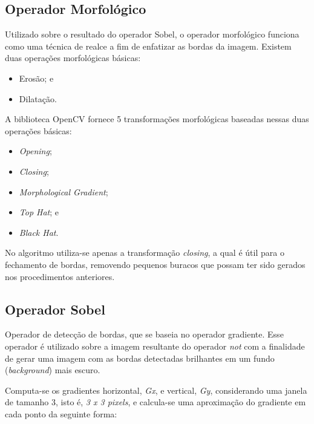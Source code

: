 \subsection{Operador Morfológico}
Utilizado sobre o resultado do operador Sobel, o operador morfológico funciona como uma técnica de realce a fim de enfatizar as bordas da imagem. 
Existem duas operações morfológicas básicas:
\begin{itemize}
    \item Erosão; e
    \item Dilatação.
\end{itemize}    

A biblioteca OpenCV fornece 5 transformações morfológicas baseadas nessas duas operações básicas:
\begin{itemize}
    \item \textit{Opening};
    \item \textit{Closing};
    \item \textit{Morphological Gradient};
    \item \textit{Top Hat}; e 
    \item \textit{Black Hat}.
\end{itemize} 

No algoritmo utiliza-se apenas a transformação \textit{closing}, a qual é útil para o fechamento de bordas, removendo pequenos buracos que possam ter sido gerados nos procedimentos anteriores.


\subsection{Operador Sobel}
Operador de detecção de bordas, que se baseia no operador gradiente. Esse operador é utilizado sobre a imagem resultante do operador \textit{not} com a finalidade de gerar uma imagem com as bordas detectadas brilhantes em um fundo (\textit{background}) mais escuro.

Computa-se os gradientes horizontal, \textit{Gx}, e vertical, \textit{Gy}, considerando uma janela de tamanho 3, isto é, \textit{3 x 3 pixels}, e calcula-se uma aproximação do gradiente em cada ponto da seguinte forma:

